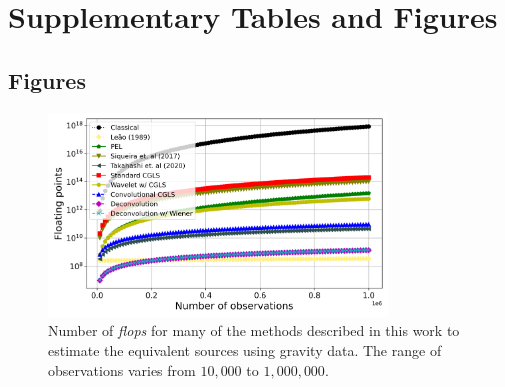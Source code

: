 





%




\section{Supplementary Tables and Figures}

\subsection{Figures}

\begin{figure}[htbp]
\begin{center}
\includegraphics[width=9cm]{Fig/flops_grav}%
\end{center}
\caption{Number of \textit{flops} for many of the methods described in this work to estimate the equivalent sources using gravity data. The range of observations varies from $10,000$ to $1,000,000$.}
\label{fig:1}
\end{figure}

